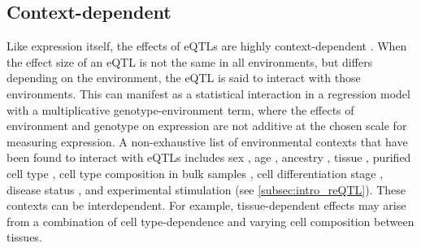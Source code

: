 \begin{outline}
\subsection{Context-dependent }
\label{subsec:intro_contextDependenteQTL}

Like expression itself, the effects of \glspl{eQTL} are highly context-dependent \autocite{albert2015RoleRegulatoryVariation,vandiedonck2017GeneticAssociationMolecular}.
When the effect size of an \gls{eQTL} is not the same in all environments, 
but differs depending on the environment, 
the \gls{eQTL} is said to interact with those environments.
This can manifest as a statistical interaction in a regression model with a multiplicative genotype-environment term,
where the effects of environment and genotype on expression are not additive at the chosen scale for measuring expression.
A non-exhaustive list of environmental contexts that have been found to interact with \glspl{eQTL} includes
    sex \autocite{yao2014SexAgeinteractingEQTLs},
    age \autocite{yao2014SexAgeinteractingEQTLs},
    ancestry \autocite{dejager2015ImmVarProjectInsights,nedelec2016GeneticAncestryNatural,quach2017LivingAdaptiveWorld},
    tissue \autocite{nica2011ArchitectureGeneRegulatory,aguet2017GeneticEffectsGene},
    purified cell type \autocite{dimas2009CommonRegulatoryVariation,dejager2015ImmVarProjectInsights,peters2016InsightGenotypePhenotypeAssociations,chen2016GeneticDriversEpigenetic,calderon2019LandscapeStimulationresponsiveChromatin},
    cell type composition in bulk samples \autocite{westra2015CellSpecificEQTL,zhernakova2017IdentificationContextdependentExpression,glastonbury2019CellTypeHeterogeneityAdipose,kim-hellmuth2020CellTypeSpecific},
    cell differentiation stage \autocite{strober2019DynamicGeneticRegulation},
    disease status \autocite{peters2016InsightGenotypePhenotypeAssociations},
    and experimental stimulation (see \cref{subsec:intro_reQTL}).
These contexts can be interdependent.
For example, tissue-dependent effects may arise from a combination of cell type-dependence and varying cell composition between tissues.


\end{outline}
